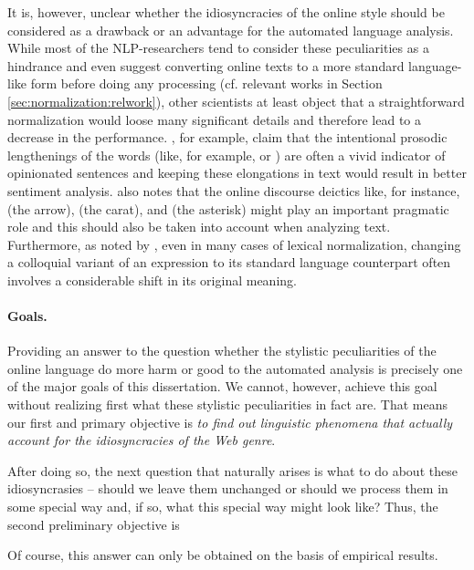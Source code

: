 It is, however, unclear whether the idiosyncracies of the online style should
be considered as a drawback or an advantage for the automated language
analysis.  While most of the NLP-researchers tend to consider these
peculiarities as a hindrance and even suggest converting online texts to a
more standard language-like form before doing any processing (cf. relevant
works in Section \ref{sec:normalization:relwork}), other scientists at least
object that a straightforward normalization would loose many significant
details and therefore lead to a decrease in the performance.
\citet{BrodyDiakopoulos:11}, for example, claim that the intentional prosodic
lengthenings of the words (like, for example,  or
) are often a vivid indicator of opinionated sentences
and keeping these elongations in text would result in better sentiment
analysis.  \citet{Collister:11,Collister:12} also notes that the online
discourse deictics like, for instance, \texample{\upshape <--} (the arrow),
\texample{\upshape\^{}} (the carat), and \texample{\upshape *} (the asterisk)
might play an important pragmatic role and this should also be taken into
account when analyzing text.  Furthermore, as noted by \citet{Eisenstein:13},
even in many cases of lexical normalization, changing a colloquial variant of
an expression to its standard language counterpart often involves a
considerable shift in its original meaning.

\paragraph{Goals.}

Providing an answer to the question whether the stylistic peculiarities of the
online language do more harm or good to the automated analysis is precisely
one of the major goals of this dissertation.  We cannot, however, achieve this
goal without realizing first what these stylistic peculiarities in fact are.
That means our first and primary objective is \emph{to find out linguistic
  phenomena that actually account for the idiosyncracies of the Web genre}.

After doing so, the next question that naturally arises is what to do about
these idiosyncrasies -- should we leave them unchanged or should we process
them in some special way and, if so, what this special way might look like?
Thus, the second preliminary objective is \emph{}


Of course, this answer can only be obtained on the basis of empirical results.


